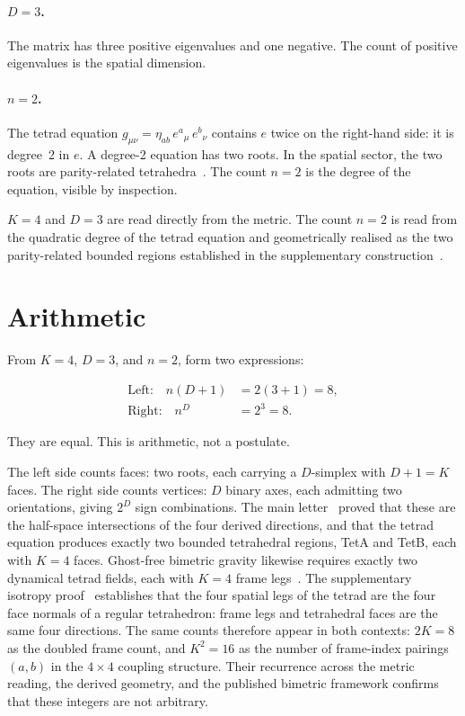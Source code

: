 \documentclass[twocolumn]{iopjournal}
\begin{document}
\paragraph{$D = 3$.} The matrix has three positive eigenvalues
and one negative. The count of positive eigenvalues is the
spatial dimension.

\paragraph{$n = 2$.} The tetrad equation
$g_{\mu\nu} = \eta_{ab}\, e^a{}_\mu\, e^b{}_\nu$ contains $e$
twice on the right-hand side: it is degree~2 in $e$. A degree-2
equation has two roots. In the spatial sector, the two roots are
parity-related tetrahedra~\cite{Nelson2026scheme}. The count
$n = 2$ is the degree of the equation, visible by inspection.

$K = 4$ and $D = 3$ are read directly from the metric. The
count $n = 2$ is read from the quadratic degree of the tetrad
equation and geometrically realised as the two parity-related
bounded regions established in the supplementary
construction~\cite{Nelson2026scheme}.


\section*{Arithmetic}

From $K = 4$, $D = 3$, and $n = 2$, form two expressions:

\begin{align}
  \text{Left:} \quad n(D + 1) &= 2(3 + 1) = 8, \label{eq:left} \\
  \text{Right:} \quad n^D &= 2^3 = 8. \label{eq:right}
\end{align}

They are equal. This is arithmetic, not a postulate.

The left side counts faces: two roots, each carrying a $D$-simplex
with $D + 1 = K$ faces. The right side counts vertices: $D$ binary
axes, each admitting two orientations, giving $2^D$ sign
combinations. The main letter~\cite{Nelson2026geometry} proved
that these are the half-space intersections of the four derived
directions, and that the tetrad equation produces exactly two
bounded tetrahedral regions, TetA and TetB, each with $K = 4$
faces. Ghost-free bimetric gravity likewise requires exactly two
dynamical tetrad fields, each with $K = 4$ frame
legs~\cite{HR2012a}. The supplementary isotropy
proof~\cite{Nelson2026signature} establishes that the four spatial
legs of the tetrad are the four face normals of a regular
tetrahedron: frame legs and tetrahedral faces are the same four
directions. The same counts therefore appear in both
contexts: $2K = 8$ as the doubled frame count, and $K^2 = 16$ as
the number of frame-index pairings $(a,b)$ in the $4 \times 4$
coupling structure. Their recurrence across the metric
reading, the derived geometry, and the published bimetric framework
confirms that these integers are not arbitrary.
\end{document}
